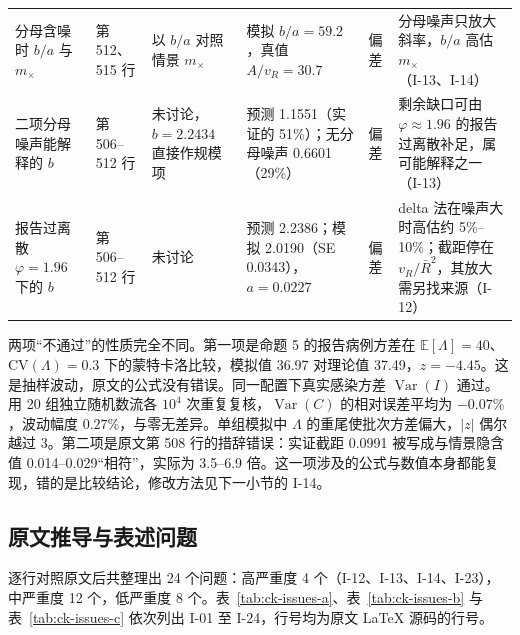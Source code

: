 \begin{table}[!tbp]
\begin{tabular}{L{2.5cm}L{1.6cm}L{2.3cm}L{2.7cm}L{0.9cm}L{4.6cm}}
分母含噪时 $b/a$ 与 $m_\times$ & 第 512、515 行 & 以 $b/a$ 对照情景 $m_\times$ & 模拟 $b/a=59.2$，真值 $A/v_R=30.7$ & 偏差 & 分母噪声只放大斜率，$b/a$ 高估 $m_\times$（I-13、I-14） \\
二项分母噪声能解释的 $b$ & 第 506--512 行 & 未讨论，$b=2.2434$ 直接作规模项 & 预测 1.1551（实证的 51\%）；无分母噪声 0.6601（29\%） & 偏差 & 剩余缺口可由 $\varphi\approx1.96$ 的报告过离散补足，属可能解释之一（I-13） \\
报告过离散 $\varphi=1.96$ 下的 $b$ & 第 506--512 行 & 未讨论 & 预测 2.2386；模拟 2.0190（SE 0.0343），$a=0.0227$ & 偏差 & delta 法在噪声大时高估约 5\%--10\%；截距停在 $v_R/\bar R^2$，其放大需另找来源（I-12） \\
\bottomrule
\end{tabular}
\end{table}

两项“不通过”的性质完全不同。第一项是命题 5 的报告病例方差在 $\mathbb{E}[\Lambda]=40$、$\mathrm{CV}(\Lambda)=0.3$ 下的蒙特卡洛比较，模拟值 36.97 对理论值 37.49，$z=-4.45$。这是抽样波动，原文的公式没有错误。同一配置下真实感染方差 $\operatorname{Var}(I)$ 通过。用 20 组独立随机数流各 $10^4$ 次重复复核，$\operatorname{Var}(C)$ 的相对误差平均为 $-0.07\%$，波动幅度 $0.27\%$，与零无差异。单组模拟中 $\Lambda$ 的重尾使批次方差偏大，$|z|$ 偶尔越过 3。第二项是原文第 508 行的措辞错误：实证截距 0.0991 被写成与情景隐含值 0.014--0.029“相符”，实际为 3.5--6.9 倍。这一项涉及的公式与数值本身都能复现，错的是比较结论，修改方法见下一小节的 I-14。

\subsection{原文推导与表述问题}

逐行对照原文后共整理出 24 个问题：高严重度 4 个（I-12、I-13、I-14、I-23），中严重度 12 个，低严重度 8 个。表~\ref{tab:ck-issues-a}、表~\ref{tab:ck-issues-b} 与表~\ref{tab:ck-issues-c} 依次列出 I-01 至 I-24，行号均为原文 \LaTeX{} 源码的行号。

